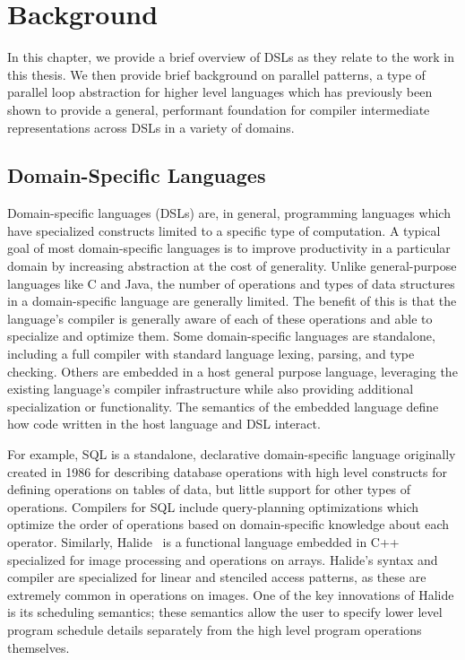 \chapter{Background}
\label{background}

In this chapter, we provide a brief overview of DSLs as they relate to the work
in this thesis. We then provide brief background on parallel patterns, a type of
parallel loop abstraction for higher level languages which has previously
been shown to provide a general, performant foundation for compiler
intermediate representations across DSLs in a variety of domains.

\section{Domain-Specific Languages}
Domain-specific languages (DSLs) are, in general, programming languages which have specialized
constructs limited to a specific type of computation. A typical goal of
most domain-specific languages is to improve productivity in a particular domain
by increasing abstraction at the cost of generality. Unlike general-purpose languages like C and Java,
the number of operations and types of data structures in a domain-specific language
are generally limited. The benefit of this is that the language's compiler is
generally aware of each of these operations and able to specialize and optimize them.
Some domain-specific languages are standalone, including a full compiler with standard language
lexing, parsing, and type checking. Others are embedded in a host general purpose language,
leveraging the existing language's compiler infrastructure while also
providing additional specialization or functionality. The semantics of the embedded language
define how code written in the host language and DSL interact.

For example, SQL is a standalone, declarative
domain-specific language originally created in 1986 for describing database operations with high level constructs
for defining operations on tables of data, but little support for other types of operations.
Compilers for SQL include query-planning optimizations which optimize the order of
operations based on domain-specific knowledge about each operator.
Similarly, Halide~\cite{pldi13halide} is a functional
language embedded in C++ specialized for image processing
and operations on arrays. Halide's syntax and compiler are specialized for linear and stenciled access patterns,
as these are extremely common in operations on images. One of the key innovations
of Halide is its scheduling semantics; these semantics allow the user to specify
lower level program schedule details separately
from the high level program operations themselves.

